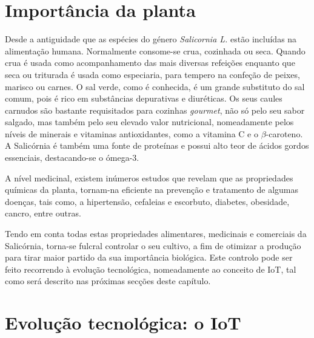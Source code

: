 \section{Importância da planta}



Desde a antiguidade que as espécies do género \textit{Salicornia L.} estão incluídas na alimentação humana. Normalmente consome-se crua, cozinhada ou seca. Quando crua é usada como acompanhamento das mais diversas refeições enquanto que seca ou triturada é usada como especiaria, para tempero na confeção de peixes, marisco ou carnes. O sal verde, como é conhecida, é um grande substituto do sal comum, pois é rico em substâncias depurativas e diuréticas. Os seus caules carnudos são bastante requisitados para cozinhas \textit{gourmet}, não só pelo seu sabor salgado, mas também pelo seu elevado valor nutricional\cite{Filomena2009}, nomeadamente pelos níveis de minerais e vitaminas antioxidantes, como a  vitamina C e o $\beta$-caroteno. A Salicórnia é também uma fonte de proteínas e possui alto teor de ácidos gordos essenciais, destacando-se o  ómega-3\cite{Ventura2011}. 

A nível medicinal, existem inúmeros estudos que revelam que as propriedades químicas da planta, tornam-na eficiente na prevenção e tratamento de algumas doenças, tais como, a hipertensão, cefaleias e escorbuto, diabetes, obesidade, cancro, entre outras\cite{Wang2012}.

Tendo em conta todas estas propriedades alimentares, medicinais e comerciais da Salicórnia, torna-se fulcral controlar o seu cultivo, a fim de otimizar a produção para tirar maior partido da sua importância biológica. Este controlo pode ser feito recorrendo à evolução tecnológica, nomeadamente ao conceito de \ac{IoT}, tal como será descrito nas próximas secções deste capítulo. 




















\section{Evolução tecnológica: o \acl{IoT}}


